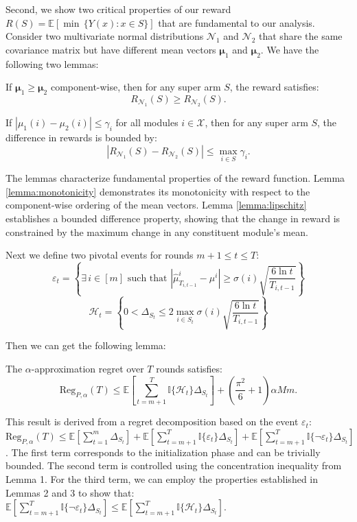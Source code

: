 \documentclass[opre,sglanonrev]{informs4}
\begin{document}
Second, we show two critical properties of our reward $R(S) = \mathbb{E}[\min\,\{Y(x) : x \in S\}]$ that are fundamental to our analysis. Consider two multivariate normal distributions $\mathcal{N}_1$ and $\mathcal{N}_2$ that share the same covariance matrix but have different mean vectors $\boldsymbol{\mu}_1$ and $\boldsymbol{\mu}_2$. We have the following two lemmas:

\begin{lemma}
\label{lemma:monotonicity}
If $\boldsymbol{\mu}_1 \geq \boldsymbol{\mu}_2$ component-wise, then for any super arm $S$, the reward satisfies:
$$
R_{\mathcal{N}_1}(S) \geq R_{\mathcal{N}_2}(S).
$$
\end{lemma}

\begin{lemma}
\label{lemma:lipschitz}
If $|\mu_1(i) - \mu_2(i)| \leq \gamma_i$ for all modules $i \in \mathcal{X}$, then for any super arm $S$, the difference in rewards is bounded by:
$$
|R_{\mathcal{N}_1}(S) - R_{\mathcal{N}_2}(S)| \leq \max_{i \in S} \gamma_i.
$$
\end{lemma}
The lemmas characterize fundamental properties of the reward function. Lemma \ref{lemma:monotonicity} demonstrates its monotonicity with respect to the component-wise ordering of the mean vectors. Lemma \ref{lemma:lipschitz} establishes a bounded difference property, showing that the change in reward is constrained by the maximum change in any constituent module's mean.

Next we define two pivotal events for rounds \(m+1 \leq t \leq T\):
$$
\varepsilon_t = \left\{\exists\, i \in [m] \text{ such that } \left|\hat{\mu}_{T_{i,t-1}}^i - \mu^i\right| \geq \sigma(i)\sqrt{\frac{6\ln t}{T_{i,t-1}}} \right\}
$$
$$
\mathcal{H}_t = \left\{0 < \Delta_{S_t} \leq 2 \max_{i \in S_t} \sigma(i)\sqrt{\frac{6\ln t}{T_{i,t-1}}} \right\}
$$

Then we can get the following lemma:

\begin{lemma}
\label{lemma:decomposition}
The \(\alpha\)-approximation regret over \(T\) rounds satisfies:
$$
\text{Reg}_{P,\alpha}(T) \leq \mathbb{E}\left[\sum_{t=m+1}^{T} \mathbb{I}\{\mathcal{H}_t\} \Delta_{S_t}\right] + \left(\frac{\pi^2}{6} + 1\right) \alpha M m.
$$
\end{lemma}

This result is derived from a regret decomposition based on the event \(\varepsilon_t\):
$
\text{Reg}_{P,\alpha}(T) \leq \mathbb{E}\left[\sum_{t=1}^{m} \Delta_{S_t}\right] + \mathbb{E}\left[\sum_{t=m+1}^{T} \mathbb{I}\{\varepsilon_t\} \Delta_{S_t}\right] + \mathbb{E}\left[\sum_{t=m+1}^{T} \mathbb{I}\{\neg \varepsilon_t\} \Delta_{S_t}\right]
$. The first term corresponds to the initialization phase and can be trivially bounded. The second term is controlled using the concentration inequality from Lemma 1. For the third term, we can employ the properties established in Lemmas 2 and 3 to show that:
$
\mathbb{E}\left[\sum_{t=m+1}^{T} \mathbb{I}\{\neg \varepsilon_t\} \Delta_{S_t}\right] \leq \mathbb{E}\left[\sum_{t=m+1}^{T} \mathbb{I}\{\mathcal{H}_t\} \Delta_{S_t}\right].
$ 
\end{document}
